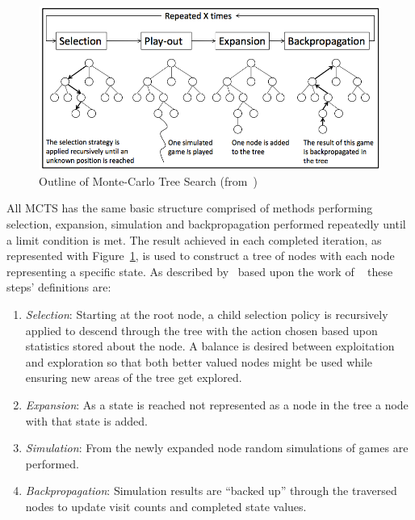 \documentclass[letterpaper]{article}
\begin{document}
\begin{figure}[!t]
\begin{center}
\includegraphics[width=\textwidth]{images/outlinemcts.png}
\end{center}
\caption{Outline of Monte-Carlo Tree Search (from~\cite{winands2010monte}) }
\label{fig:OUTMCTS}
\end{figure}

All MCTS has the same basic structure comprised of methods performing selection, expansion, simulation and backpropagation performed repeatedly until a limit condition is met. The result achieved in each completed iteration, as represented with Figure~\ref{fig:OUTMCTS}, is used to construct a tree of nodes with each node representing a specific state. As described by~\cite{browne2012survey} based upon the work of ~\cite{chaslot2008monte} these steps' definitions are:
\begin{enumerate}
\item \emph{Selection}: Starting at the root node, a child selection policy is recursively applied to descend through the tree with the action chosen based upon statistics stored about the node. A balance is desired between exploitation and exploration so that both better valued nodes might be used while ensuring new areas of the tree get explored.
\item \emph{Expansion}: As a state is reached not represented as a node in the tree a node with that state is added.
\item \emph{Simulation}: From the newly expanded node random simulations of games are performed.
\item \emph{Backpropagation}: Simulation results are ``backed up'' through the traversed nodes to update visit counts and completed state values.
\end{enumerate}
\end{document}
